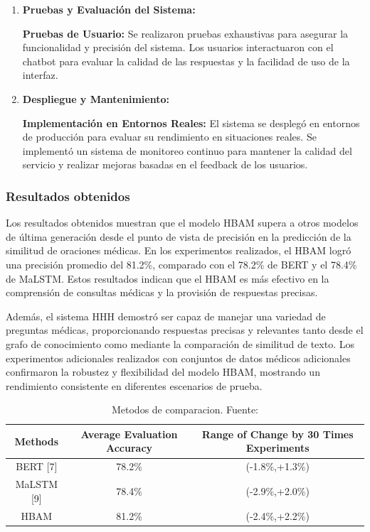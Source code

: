 \begin{enumerate}
		\item \textbf{Pruebas y Evaluación del Sistema:}
		
			\subitem \textbf{Pruebas de Usuario:} Se realizaron pruebas exhaustivas para asegurar la funcionalidad y precisión del sistema. Los usuarios interactuaron con el chatbot para evaluar la calidad de las respuestas y la facilidad de uso de la interfaz.
		
		\item \textbf{Despliegue y Mantenimiento:}
		
			\subitem \textbf{Implementación en Entornos Reales:} El sistema se desplegó en entornos de producción para evaluar su rendimiento en situaciones reales. Se implementó un sistema de monitoreo continuo para mantener la calidad del servicio y realizar mejoras basadas en el feedback de los usuarios.
		
	\end{enumerate}

	\subsubsection{Resultados obtenidos}
		Los resultados obtenidos muestran que el modelo HBAM supera a otros modelos de última generación desde el punto de vista de precisión en la predicción de la similitud de oraciones médicas. En los experimentos realizados, el HBAM logró una precisión promedio del 81.2\%, comparado con el 78.2\% de BERT y el 78.4\% de MaLSTM. Estos resultados indican que el HBAM es más efectivo en la comprensión de consultas médicas y la provisión de respuestas precisas.

		Además, el sistema HHH demostró ser capaz de manejar una variedad de preguntas médicas, proporcionando respuestas precisas y relevantes tanto desde el grafo de conocimiento como mediante la comparación de similitud de texto. Los experimentos adicionales realizados con conjuntos de datos médicos adicionales confirmaron la robustez y flexibilidad del modelo HBAM, mostrando un rendimiento consistente en diferentes escenarios de prueba.

		\begin{table}[h!]
			\centering
			\caption{Metodos de comparacion. Fuente:  \cite{HHHAnOnlineMedical}}
			\begin{tabular}{ccc}
				\hline
				\textbf{Methods} & \textbf{Average Evaluation Accuracy} & \textbf{Range of Change by 30 Times Experiments} \\ \hline
				BERT [7] & 78.2\% & (-1.8\%,+1.3\%) \\
				MaLSTM [9] & 78.4\% & (-2.9\%,+2.0\%) \\
				HBAM & 81.2\% & (-2.4\%,+2.2\%) \\
				\hline
			\end{tabular}
		\end{table}
		
